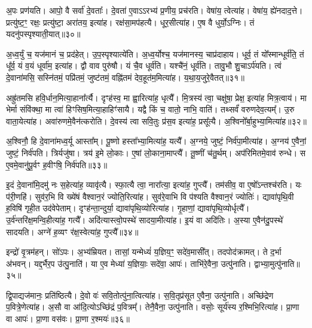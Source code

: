 अ॒पः प्रण॑यति।
आपो॒ वै सर्वा॑ दे॒वताः᳚।
दे॒वता॑ ए॒वाऽऽरभ्य॑ प्र॒णीय॒ प्रच॑रति।
वेषा॑य॒ त्वेत्या॑ह।
वेषा॑य॒ ह्ये॑नदाद॒त्ते।
प्रत्यु॑ष्ट॒ꣳ॒ रक्षः॒ प्रत्यु॑ष्टा॒ अरा॑तय॒ इत्या॑ह।
रक्ष॑सा॒मप॑हत्यै।
धूर॒सीत्या॑ह।
ए॒ष वै धुर्यो॒\-ऽग्निः।
तं यदनु॑पस्पृश्याती॒यात्॥३०॥\ip

अ॒ध्व॒र्युं च॒ यज॑मानं च॒ प्रद॑हेत्।
उ॒प॒स्पृश्यात्ये॑ति।
अ॒ध्व॒र्योश्च॒ यज॑मानस्य॒ चाप्र॑दाहाय।
धूर्व॒ तं यो᳚स्मान्धूर्व॑ति॒ तं धू᳚र्व॒ यं व॒यं धूर्वा॑म॒ इत्या॑ह।
द्वौ वाव पुरु॑षौ।
यं चै॒व धूर्व॑ति।
यश्चै॑नं॒ धूर्व॑ति।
तावु॒भौ शु॒चा\-ऽर्प॑यति।
त्वं दे॒वाना॑मसि॒ सस्नि॑तमं॒ पप्रि॑तमं॒ जुष्ट॑तमं॒ वह्नि॑तमं देव॒हूत॑म॒मित्या॑ह।
य॒था॒\-य॒जु\-रे॒वै\-तत्॥३१॥\ip

अह्रु॑तमसि हवि॒र्धान॒मित्या॒हाना᳚र्त्यै।
दृꣳह॑स्व॒ मा ह्वा॒रित्या॑ह॒ धृत्यै᳚।
मि॒त्रस्य॑ त्वा॒ चक्षु॑षा॒ प्रेक्ष॒ इत्या॑ह मित्र॒त्वाय॑।
मा भेर्मा संवि॑क्था॒ मा त्वा॑ हिꣳसिष॒मित्या॒हाहिꣳ॑सायै।
यद्वै किं च॒ वातो॒ नाभि॒ वाति॑।
तथ्सर्वं॑ वरुणदेव॒त्यम्᳚।
उ॒रु वाता॒येत्या॑ह।
अवा॑रुणमे॒वैन॑त्करोति।
दे॒वस्य॑ त्वा सवि॒तुः प्र॑स॒व इत्या॑ह॒ प्रसू᳚त्यै।
अ॒श्विनो᳚र्बा॒हुभ्या॒मित्या॑ह॥३२॥\ip

अ॒श्विनौ॒ हि दे॒वाना॑मध्व॒र्यू आस्ता᳚म्।
पू॒ष्णो हस्ता᳚भ्या॒मित्या॑ह॒ यत्यै᳚।
अ॒ग्नये॒ जुष्टं॒ निर्व॑पा॒मीत्या॑ह।
अ॒ग्नय॑ ए॒वैनां॒ जुष्टं॒ निर्व॑पति।
त्रिर्यजु॑षा।
त्रय॑ इ॒मे लो॒काः।
ए॒षां लो॒काना॒माप्त्यै᳚।
तू॒ष्णीं च॑तु॒र्थम्।
अप॑रिमितमे॒वाव॑ रुन्धे।
स ए॒वमे॒वानु॑पू॒र्वꣳ ह॒वीꣳषि॒ निर्व॑पति॥३३॥\ip

इ॒दं दे॒वाना॑मि॒दमु॑ नः स॒हेत्या॑ह॒ व्यावृ॑त्यै।
स्फा॒त्यै त्वा॒ नारा᳚त्या॒ इत्या॑ह॒ गुप्त्यै᳚।
तम॑सीव॒ वा ए॒षो᳚\-ऽन्तश्च॑रति।
यः प॑री॒णहि॑।
सुव॑र॒भि वि ख्ये॑षं वैश्वान॒रं ज्योति॒रित्या॑ह।
सुव॑रे॒वाभि वि प॑श्यति वैश्वान॒रं ज्योतिः॑।
द्यावा॑पृथि॒वी ह॒विषि॑ गृही॒त उद॑वेपेताम्।
दृꣳह॑न्ता॒न्दुर्या॒ द्यावा॑पृथि॒व्योरित्या॑ह।
गृ॒हाणां॒ द्यावा॑पृथि॒व्योर्धृत्यै᳚।
उ॒र्व॑न्तरि॑क्ष॒मन्वि॒हीत्या॑ह॒ गत्यै᳚।
अदि॑त्यास्त्वो॒पस्थे॑ सादया॒मीत्या॑ह।
इ॒यं वा अदि॑तिः।
अ॒स्या ए॒वैन॑दु॒पस्थे॑ सादयति।
अग्ने॑ ह॒व्यꣳ र॑क्ष॒स्वेत्या॑ह॒ गुप्त्यै᳚॥३४॥\ip\anuvakamend[य॒ज्ञो वा आपो॒ धाम॑ प्र॒णीय॒ प्रच॑रत्यती॒यादे॒तद्बा॒हुभ्या॒मित्या॑ह ह॒वीꣳषि॒ निर्व॑पति॒ गत्यै॑ च॒त्वारि॑ च]

इन्द्रो॑ वृ॒त्रम॑हन्।
सो॑ऽपः।
अ॒भ्य॑म्रियत।
तासां॒ यन्मेध्यं॑ य॒ज्ञिय॒ꣳ॒ सदे॑व॒मासी᳚त्।
तदपोद॑क्रामत्।
ते द॒र्भा अ॑भवन्।
यद्द॒र्भैर॒प उ॑त्पु॒नाति॑।
या ए॒व मेध्या॑ य॒ज्ञियाः॒ सदे॑वा॒ आपः॑।
ताभि॑रे॒वैना॒ उत्पु॑नाति।
द्वाभ्या॒मुत्पु॑नाति॥३५॥\ip

द्वि॒पाद्यज॑मानः॒ प्रति॑\-ष्ठित्यै।
दे॒वो वः॑ सवि॒तोत्पु॑ना॒त्वित्या॑ह।
स॒वि॒तृप्र॑सूत ए॒वैना॒ उत्पु॑नाति।
अच्छि॑द्रेण प॒वित्रे॒णेत्या॑ह।
अ॒सौ वा आ॑दि॒त्यो\-ऽच्छि॑द्रं प॒वित्रम्᳚।
तेनै॒वैना॒ उत्पु॑नाति।
वसोः॒ सूर्य॑स्य र॒श्मिभि॒रित्या॑ह।
प्रा॒णा वा आपः॑।
प्रा॒णा वस॑वः।
प्रा॒णा र॒श्मयः॑॥३६॥\ip

